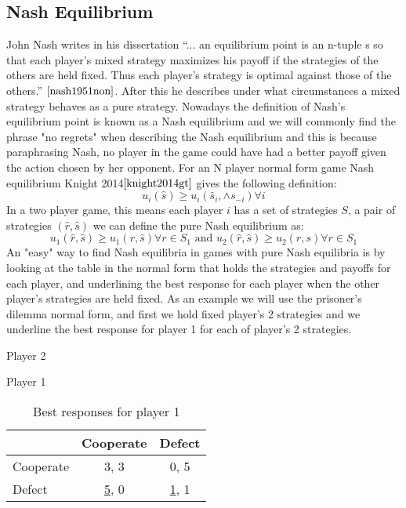 \documentclass{book}
\begin{document}
\subsection{Nash Equilibrium}\label{third_section}
John Nash writes in his dissertation ``... an equilibrium point is an n-tuple s so that each player's mixed strategy maximizes his payoff if the strategies of the others are held fixed. Thus each player's strategy is optimal against those of the others.'' $\cite{nash1951non}$.  After this he describes under what circumstances a mixed strategy behaves as a pure strategy. Nowadays the definition of Nash's equilibrium point is known as a Nash equilibrium and we will commonly find the phrase "no regrets" when describing the Nash equilibrium and this is because paraphrasing Nash, no player in the game could have had a better payoff given the action chosen by her opponent. For an N player normal form game Nash equilibrium Knight 2014$\cite{knight2014gt}$ gives the following definition:
\begin{equation}
u_i(\hat{s}) \geq u_i(\bar{s}_i, \wedge{s}_{-i}) \forall i
\end{equation}
 In a two player game, this means each player $\textit{i}$ has a set of strategies $\textit{S}$,  a pair of strategies $(\hat{r}, \hat{s})$ we can define the pure Nash equilibrium as:
\begin{equation}
u_1(\hat{r}, \hat{s}) \geq u_1(r, \hat{s}) \forall r \in S_1   \text{ and }  u_2(\hat{r}, \hat{s}) \geq u_2(\hat{r}, s) \forall r \in S_1
\end{equation}
An "easy" way to find Nash equilibria in games with pure Nash equilibria is by looking at the table in the normal form that holds the strategies and payoffs for each player, and underlining the best response for each player when the other player's strategies are held fixed.
As an example we will use the prisoner's dilemma normal form, and first we hold fixed player's 2 strategies and we underline the best response for player 1 for each of player's 2 strategies.

\begin{table}[h]
\begin{center}
Player 2

Player 1
\begin{tabular}{|l|c|c|}
\hline
 & Cooperate & Defect\\ 
\hline
Cooperate & 3, 3 & 0, 5\\
\hline
Defect & \underline{5}, 0 & \underline{1}, 1\\
\hline
\end{tabular}
\caption{Best responses for player 1}
\label{tab:normformbr1}
\end{center}
\end{table}
\end{document}
